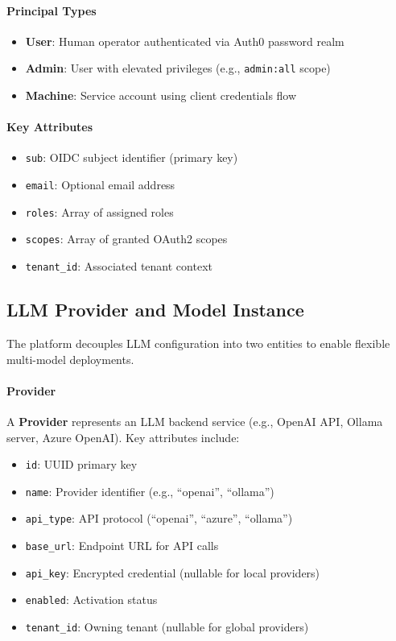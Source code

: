 \paragraph{Principal Types}
\begin{itemize}
    \item \textbf{User}: Human operator authenticated via Auth0 password realm
    \item \textbf{Admin}: User with elevated privileges (e.g., \texttt{admin:all} scope)
    \item \textbf{Machine}: Service account using client credentials flow
\end{itemize}

\paragraph{Key Attributes}
\begin{itemize}
    \item \texttt{sub}: OIDC subject identifier (primary key)
    \item \texttt{email}: Optional email address
    \item \texttt{roles}: Array of assigned roles
    \item \texttt{scopes}: Array of granted OAuth2 scopes
    \item \texttt{tenant\_id}: Associated tenant context
\end{itemize}

\subsection{LLM Provider and Model Instance}

The platform decouples LLM configuration into two entities to enable flexible multi-model deployments.

\paragraph{Provider}
A \textbf{Provider} represents an LLM backend service (e.g., OpenAI API, Ollama server, Azure OpenAI). Key attributes include:
\begin{itemize}
    \item \texttt{id}: UUID primary key
    \item \texttt{name}: Provider identifier (e.g., ``openai'', ``ollama'')
    \item \texttt{api\_type}: API protocol (``openai'', ``azure'', ``ollama'')
    \item \texttt{base\_url}: Endpoint URL for API calls
    \item \texttt{api\_key}: Encrypted credential (nullable for local providers)
    \item \texttt{enabled}: Activation status
    \item \texttt{tenant\_id}: Owning tenant (nullable for global providers)
\end{itemize}

